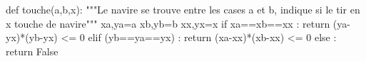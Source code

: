 \question{}
\begin{pyverbatim}
def touche(a,b,x):
    """Le navire se trouve entre les cases a et b, indique si le tir
    en x touche de navire"""
    xa,ya=a
    xb,yb=b
    xx,yx=x
    if xa==xb==xx :
        return (ya-yx)*(yb-yx) <= 0
    elif (yb==ya==yx) :
        return (xa-xx)*(xb-xx) <= 0
    else :
        return False 
\end{pyverbatim}
